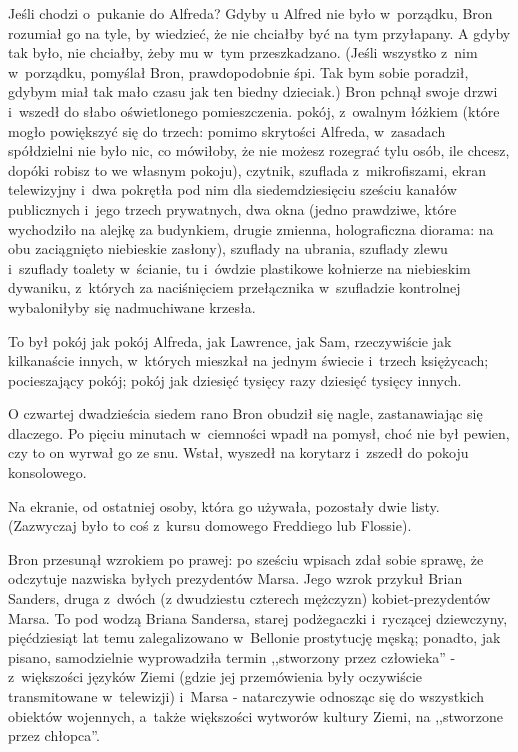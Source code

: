 \documentclass[oneside,polish,11pt,rmheadings]{mwbk}
\begin{document}
Jeśli chodzi o~pukanie do Alfreda? Gdyby u Alfred nie było w~porządku, Bron rozumiał go na tyle, by wiedzieć, że nie chciałby być na tym przyłapany. A gdyby tak było, nie chciałby, żeby mu w~tym przeszkadzano. (Jeśli wszystko z~nim w~porządku, pomyślał Bron, prawdopodobnie śpi. Tak bym sobie poradził, gdybym miał tak mało czasu jak ten biedny dzieciak.) Bron pchnął swoje drzwi i~wszedł do słabo oświetlonego pomieszczenia. pokój, z~owalnym łóżkiem (które mogło powiększyć się do trzech: pomimo skrytości Alfreda, w~zasadach spółdzielni nie było nic, co mówiłoby, że nie możesz rozegrać tylu osób, ile chcesz, dopóki robisz to we własnym pokoju), czytnik,  szuflada z~mikrofiszami, ekran telewizyjny i~dwa pokrętła pod nim dla siedemdziesięciu sześciu kanałów publicznych i~jego trzech prywatnych, dwa okna (jedno prawdziwe, które wychodziło na alejkę za budynkiem, drugie zmienna, holograficzna diorama: na obu zaciągnięto niebieskie zasłony), szuflady na ubrania, szuflady zlewu i~szuflady toalety w~ścianie, tu i~ówdzie plastikowe kołnierze na niebieskim dywaniku, z~których za naciśnięciem przełącznika w~szufladzie kontrolnej wybaloniłyby się nadmuchiwane krzesła. 

To był pokój jak pokój Alfreda, jak Lawrence, jak Sam, rzeczywiście jak kilkanaście innych, w~których mieszkał na jednym świecie i~trzech księżycach; pocieszający pokój; pokój jak dziesięć tysięcy razy dziesięć tysięcy innych. 

O czwartej dwadzieścia siedem rano Bron obudził się nagle, zastanawiając się dlaczego. Po pięciu minutach w~ciemności wpadł na pomysł, choć nie był pewien, czy to on wyrwał go ze snu. Wstał, wyszedł na korytarz i~zszedł do pokoju konsolowego. 

Na ekranie, od ostatniej osoby, która go używała, pozostały dwie listy. (Zazwyczaj było to coś z~kursu domowego Freddiego lub Flossie). 

Bron przesunął wzrokiem po prawej: po sześciu wpisach zdał sobie sprawę, że odczytuje nazwiska byłych prezydentów Marsa. Jego wzrok przykuł Brian Sanders, druga z~dwóch (z dwudziestu czterech mężczyzn) kobiet-prezydentów Marsa. To pod wodzą Briana Sandersa, starej podżegaczki i~ryczącej dziewczyny, pięćdziesiąt lat temu zalegalizowano w~Bellonie prostytucję męską; ponadto, jak pisano, samodzielnie wyprowadziła termin ,,stworzony przez człowieka'' - z~większości języków Ziemi (gdzie jej przemówienia były oczywiście transmitowane w~telewizji) i~Marsa - natarczywie odnosząc się do wszystkich obiektów wojennych, a~także większości wytworów kultury Ziemi, na ,,stworzone przez chłopca''. 
\end{document}
